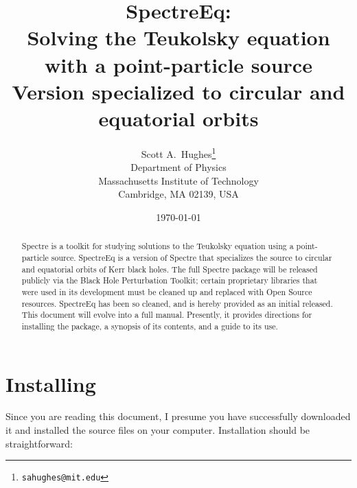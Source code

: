 \documentclass[11pt]{article}
\date{\today}
\begin{document}
\title{SpectreEq:\\ Solving the Teukolsky equation with a point-particle source\\ Version specialized to circular and equatorial orbits}
\author{Scott A.\ Hughes\thanks{\tt sahughes@mit.edu}\\
Department of Physics\\
Massachusetts Institute of Technology\\
Cambridge, MA 02139, USA}

\maketitle

\begin{abstract}
\noindent
Spectre is a toolkit for studying solutions to the Teukolsky equation using a point-particle source.  SpectreEq is a version of Spectre that specializes the source to circular and equatorial orbits of Kerr black holes.  The full Spectre package will be released publicly via the Black Hole Perturbation Toolkit; certain proprietary libraries that were used in its development must be cleaned up and replaced with Open Source resources.  SpectreEq has been so cleaned, and is hereby provided as an initial released.  This document will evolve into a full manual.  Presently, it provides directions for installing the package, a synopsis of its contents, and a guide to its use.
\end{abstract}

\section{Installing}

Since you are reading this document, I presume you have successfully downloaded it and installed the source files on your computer.  Installation should be straightforward:
\end{document}
